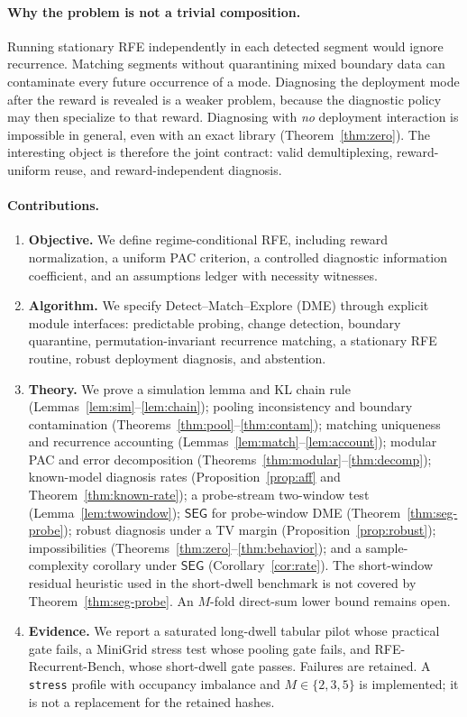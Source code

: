 \documentclass[11pt]{article}
\newcommand{\SEG}{\mathsf{SEG}}
\newcommand{\DME}{\textsc{DME}}
\begin{document}
\paragraph{Why the problem is not a trivial composition.}
Running stationary RFE independently in each detected segment would ignore
recurrence. Matching segments without quarantining mixed boundary data can
contaminate every future occurrence of a mode. Diagnosing the deployment mode
after the reward is revealed is a weaker problem, because the diagnostic
policy may then specialize to that reward. Diagnosing with \emph{no}
deployment interaction is impossible in general, even with an exact library
(Theorem~\ref{thm:zero}). The interesting object is therefore the joint
contract: valid demultiplexing, reward-uniform reuse, and reward-independent
diagnosis.

\paragraph{Contributions.}
\begin{enumerate}[leftmargin=1.4em]
\item \textbf{Objective.} We define regime-conditional RFE, including
reward normalization, a uniform PAC criterion, a controlled diagnostic
information coefficient, and an assumptions ledger with necessity witnesses.
\item \textbf{Algorithm.} We specify Detect--Match--Explore (\DME) through
explicit module interfaces: predictable probing, change detection, boundary
quarantine, permutation-invariant recurrence matching, a stationary RFE
routine, robust deployment diagnosis, and abstention.
\item \textbf{Theory.} We prove a simulation lemma and KL chain rule
(Lemmas~\ref{lem:sim}--\ref{lem:chain}); pooling inconsistency and boundary
contamination (Theorems~\ref{thm:pool}--\ref{thm:contam}); matching uniqueness
and recurrence accounting (Lemmas~\ref{lem:match}--\ref{lem:account}); modular
PAC and error decomposition (Theorems~\ref{thm:modular}--\ref{thm:decomp});
known-model diagnosis rates (Proposition~\ref{prop:aff} and
Theorem~\ref{thm:known-rate}); a probe-stream two-window test
(Lemma~\ref{lem:twowindow}); $\SEG$ for probe-window \DME{}
(Theorem~\ref{thm:seg-probe}); robust diagnosis under a TV margin
(Proposition~\ref{prop:robust}); impossibilities
(Theorems~\ref{thm:zero}--\ref{thm:behavior}); and a sample-complexity
corollary under $\SEG$ (Corollary~\ref{cor:rate}). The short-window residual
heuristic used in the short-dwell benchmark is not covered by
Theorem~\ref{thm:seg-probe}. An $M$-fold direct-sum lower bound remains open.
\item \textbf{Evidence.} We report a saturated long-dwell tabular pilot whose
practical gate fails, a MiniGrid stress test whose pooling gate fails, and
RFE-Recurrent-Bench, whose short-dwell gate passes. Failures are retained.
A \texttt{stress} profile with occupancy imbalance and $M\in\{2,3,5\}$ is
implemented; it is not a replacement for the retained hashes.
\end{enumerate}
\end{document}
